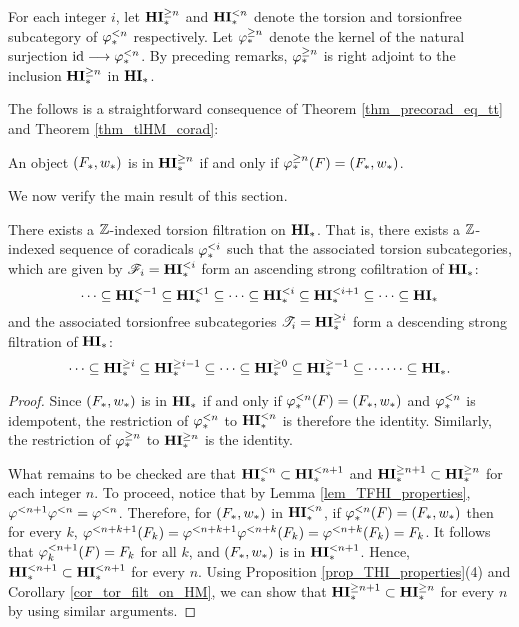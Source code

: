 \begin{defn}
For each integer $i$, let $\THM{n}$ and $\TFHM{n}$ denote the 
torsion and torsionfree subcategory of $\tlHM{n}$ respectively.
Let $\tgHM{n}$ denote the kernel of the natural surjection
$\id \to \tlHM{n}$. By preceding remarks, $\tgHM{n}$ is right
adjoint to the inclusion $\THM{n}$ in $\HM$.
\end{defn}

The follows is a straightforward consequence of Theorem
\ref{thm_precorad_eq_tt} and Theorem \ref{thm_tlHM_corad}:

\begin{cor}\label{cor_tgHM_prop}
An object $(F_*, \deloop_*)$ is in $\THM{n}$ if and only
if $\tgHM{n}(F) = (F_*, \deloop_*)$.
\end{cor}

We now verify the main result of this section.

\begin{cor}\label{cor_tor_filt_on_HM}
There exists a $\Z$-indexed torsion filtration on $\HM$. That 
is, there exists a $\Z$-indexed sequence of coradicals $\tlHM{i}$
such that the associated torsion subcategories, which are given
by $\Cat{F}_i = \TFHM{i}$
form an ascending strong cofiltration of $\HM$:
\[
\cdots \subseteq \TFHM{-1} \subseteq \TFHM{1} \subseteq \cdots 
   \subseteq \TFHM{i} \subseteq \TFHM{i + 1} \subseteq \cdots 
   \subseteq \HM
\]
and the associated torsionfree subcategories $\Cat{T}_i = \THM{i}$
form a descending strong filtration of $\HM$:
\[
\cdots \subseteq \THM{i} \subseteq \THM{i - 1} \subseteq 
   \cdots \subseteq \THM{0} \subseteq \THM{-1} \subseteq \cdots
   \cdots \subseteq \HM.
\]
\end{cor}
\begin{proof}
Since $(F_*, \deloop_*)$ is in $\HM$ if and only if $\tlHM{n}(F) =
(F_*, \deloop_*)$ and $\tlHM{n}$ is idempotent, the restriction
of $\tlHM{n}$ to $\TFHM{n}$ is therefore the identity. Similarly,
the restriction of $\tgHM{n}$ to $\THM{n}$ is the identity.

What remains to be checked are that $\TFHM{n} \subset \TFHM{n + 1}$
and $\THM{n + 1} \subset \THM{n}$ for each integer $n$. To 
proceed, notice that by Lemma \ref{lem_TFHI_properties}, 
$\tlHI{n + 1}\tlHI{n} = \tlHI{n}$. Therefore, for $(F_*, 
\deloop_*)$ in $\TFHM{n}$, if $\tlHM{n}(F) = (F_*, \deloop_*)$ 
then for every $k$, $\tlHI{n + k + 1}(F_k) = \tlHI{n + k + 1}\tlHI{n + k}(F_k) = 
\tlHI{n + k}(F_k) = F_k$. It follows that $\tlHM[k]{n + 1}(F) = 
F_k$ for all $k$, and $(F_*, \deloop_*)$ is in $\TFHM{n + 1}$.
Hence, $\TFHM{n + 1} \subset \TFHM{n + 1}$ for every $n$. Using 
Proposition \ref{prop_THI_properties}(4) and Corollary 
\ref{cor_tor_filt_on_HM}, we can show that $\THM{n + 1} \subset 
\THM{n}$ for every $n$ by using similar arguments.
\end{proof}

